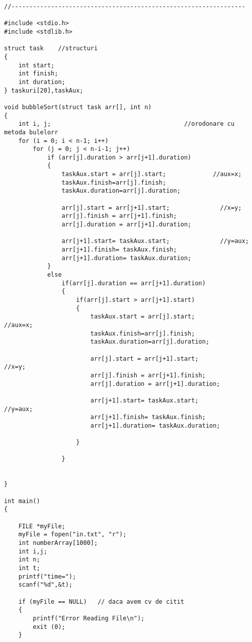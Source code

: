 \documentclass[14pt]{article}
\begin{document}
\begin{lstlisting}
//-----------------------------------------------------------------

#include <stdio.h>
#include <stdlib.h>

struct task    //structuri
{
    int start;
    int finish;
    int duration;
} taskuri[20],taskAux;

void bubbleSort(struct task arr[], int n)
{
    int i, j;                                     //orodonare cu metoda bulelorr
    for (i = 0; i < n-1; i++)
        for (j = 0; j < n-i-1; j++)
            if (arr[j].duration > arr[j+1].duration)
            {
                taskAux.start = arr[j].start;             //aux=x;
                taskAux.finish=arr[j].finish;
                taskAux.duration=arr[j].duration;

                arr[j].start = arr[j+1].start;              //x=y;
                arr[j].finish = arr[j+1].finish;
                arr[j].duration = arr[j+1].duration;

                arr[j+1].start= taskAux.start;              //y=aux;
                arr[j+1].finish= taskAux.finish;
                arr[j+1].duration= taskAux.duration;
            }
            else
                if(arr[j].duration == arr[j+1].duration)
                {
                    if(arr[j].start > arr[j+1].start)
                    {
                        taskAux.start = arr[j].start;             //aux=x;
                        taskAux.finish=arr[j].finish;
                        taskAux.duration=arr[j].duration;

                        arr[j].start = arr[j+1].start;              //x=y;
                        arr[j].finish = arr[j+1].finish;
                        arr[j].duration = arr[j+1].duration;

                        arr[j+1].start= taskAux.start;              //y=aux;
                        arr[j+1].finish= taskAux.finish;
                        arr[j+1].duration= taskAux.duration;

                    }

                }


}

int main()
{

    FILE *myFile;
    myFile = fopen("in.txt", "r");
    int numberArray[1000];
    int i,j;
    int n;
    int t;
    printf("time=");
    scanf("%d",&t);

    if (myFile == NULL)   // daca avem cv de citit
    {
        printf("Error Reading File\n");
        exit (0);
    }


\end{lstlisting}
\end{document}
